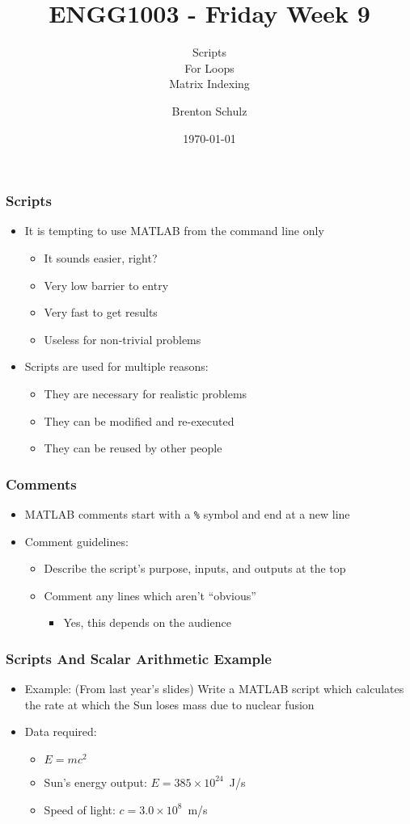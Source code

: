 \documentclass[14pt]{beamer}
\title{ENGG1003 - Friday Week 9}
\subtitle{Scripts\\For Loops\\Matrix Indexing}
\author{Brenton Schulz}
\institute{University of Newcastle}
\date{\today}
\begin{document}
\titlepage

\begin{frame}
\frametitle{Scripts}
\begin{itemize}
\item It is tempting to use MATLAB from the command line only
	\begin{itemize}
		\item It sounds easier, right?
		\item Very low barrier to entry
		\item Very fast to get results
		\pause
		\item Useless for non-trivial problems
	\end{itemize}
\pause
\item Scripts are used for multiple reasons:
	\begin{itemize}
		\item They are necessary for realistic problems
		\item They can be modified and re-executed
		\item They can be reused by other people
	\end{itemize}
\end{itemize}
\end{frame}

\begin{frame}
\frametitle{Comments}
\begin{itemize}
\item MATLAB comments start with a \texttt{\%} symbol and end at a new line
\item Comment guidelines:
	\begin{itemize}
		\item Describe the script's purpose, inputs, and outputs at the top
		\item Comment any lines which aren't ``obvious''
			\begin{itemize}
				\item Yes, this depends on the audience
			\end{itemize}
	\end{itemize}
\end{itemize}
\end{frame}

\begin{frame}
\frametitle{Scripts And Scalar Arithmetic Example}
\begin{itemize}
\item Example: (From last year's slides) Write a MATLAB script which calculates the rate at which the Sun loses mass due to nuclear fusion
\item Data required:
	\begin{itemize}
		\item $E=mc^2$
		\item Sun's energy output: $E=385 \times 10^{24}$~J/s
		\item Speed of light: $c=3.0 \times 10^8$~m/s
	\end{itemize}
\end{itemize}
\end{frame}
\end{document}
